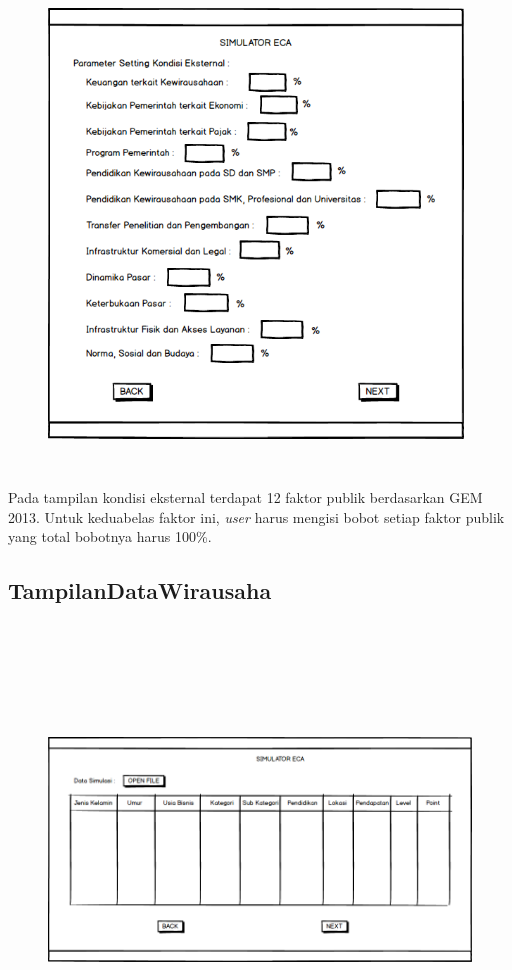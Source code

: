 \begin{figure} [H]
	\centering  
	\includegraphics[width=11cm, height=13cm]{mockup3} 
	\label{fig:kondisiEksternal} 
\end{figure}

Pada tampilan kondisi eksternal terdapat 12 faktor publik berdasarkan GEM 2013. Untuk keduabelas faktor ini, \textit{user} harus mengisi bobot setiap faktor publik yang total bobotnya harus 100\%. 

\subsection{TampilanDataWirausaha}

\begin{figure} [H]
	\centering  
	\includegraphics[width=15cm, height=12cm]{mockup4} 
	\label{fig:kondisiDataWirausaha} 
\end{figure}

